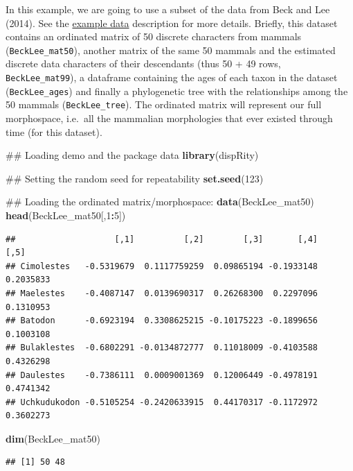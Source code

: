 \documentclass[]{book}
\newenvironment{Shaded}{\begin{snugshade}}{\end{snugshade}}
\newcommand{\KeywordTok}[1]{\textcolor[rgb]{0.13,0.29,0.53}{\textbf{#1}}}
\newcommand{\DecValTok}[1]{\textcolor[rgb]{0.00,0.00,0.81}{#1}}
\newcommand{\OperatorTok}[1]{\textcolor[rgb]{0.81,0.36,0.00}{\textbf{#1}}}
\newcommand{\NormalTok}[1]{#1}
\theoremstyle{definition}
\theoremstyle{definition}
\theoremstyle{remark}
\begin{document}
In this example, we are going to use a subset of the data from Beck and
Lee (2014). See the \protect\hyperlink{example-data}{example data}
description for more details. Briefly, this dataset contains an
ordinated matrix of 50 discrete characters from mammals
(\texttt{BeckLee\_mat50}), another matrix of the same 50 mammals and the
estimated discrete data characters of their descendants (thus 50 + 49
rows, \texttt{BeckLee\_mat99}), a dataframe containing the ages of each
taxon in the dataset (\texttt{BeckLee\_ages}) and finally a phylogenetic
tree with the relationships among the 50 mammals
(\texttt{BeckLee\_tree}). The ordinated matrix will represent our full
morphospace, i.e.~all the mammalian morphologies that ever existed
through time (for this dataset).

\begin{Shaded}
\begin{Highlighting}[]
\NormalTok{## Loading demo and the package data}
\KeywordTok{library}\NormalTok{(dispRity)}

\NormalTok{## Setting the random seed for repeatability}
\KeywordTok{set.seed}\NormalTok{(}\DecValTok{123}\NormalTok{)}

\NormalTok{## Loading the ordinated matrix/morphospace:}
\KeywordTok{data}\NormalTok{(BeckLee_mat50)}
\KeywordTok{head}\NormalTok{(BeckLee_mat50[,}\DecValTok{1}\OperatorTok{:}\DecValTok{5}\NormalTok{])}
\end{Highlighting}
\end{Shaded}

\begin{verbatim}
##                    [,1]          [,2]        [,3]       [,4]      [,5]
## Cimolestes   -0.5319679  0.1117759259  0.09865194 -0.1933148 0.2035833
## Maelestes    -0.4087147  0.0139690317  0.26268300  0.2297096 0.1310953
## Batodon      -0.6923194  0.3308625215 -0.10175223 -0.1899656 0.1003108
## Bulaklestes  -0.6802291 -0.0134872777  0.11018009 -0.4103588 0.4326298
## Daulestes    -0.7386111  0.0009001369  0.12006449 -0.4978191 0.4741342
## Uchkudukodon -0.5105254 -0.2420633915  0.44170317 -0.1172972 0.3602273
\end{verbatim}

\begin{Shaded}
\begin{Highlighting}[]
\KeywordTok{dim}\NormalTok{(BeckLee_mat50)}
\end{Highlighting}
\end{Shaded}

\begin{verbatim}
## [1] 50 48
\end{verbatim}
\end{document}
